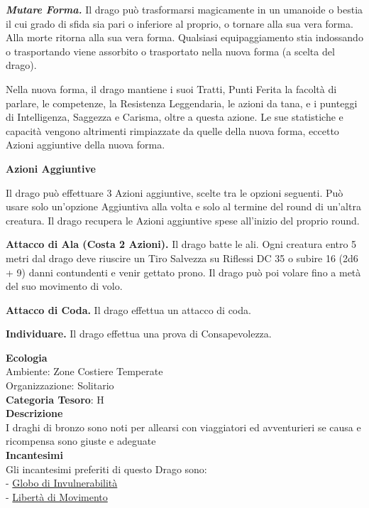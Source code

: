 \begin{multicols}{2}
{\emph{\textbf{Mutare Forma.}} Il drago può trasformarsi magicamente in un umanoide o bestia il cui grado di sfida sia pari o inferiore al proprio, o tornare alla sua vera forma. Alla morte ritorna alla sua vera forma. Qualsiasi equipaggiamento stia indossando o trasportando viene assorbito o trasportato nella nuova forma (a scelta del drago).

Nella nuova forma, il drago mantiene i suoi Tratti, Punti Ferita la facoltà di parlare, le competenze, la Resistenza Leggendaria, le azioni da tana, e i punteggi di Intelligenza, Saggezza e Carisma, oltre a questa azione. Le sue statistiche e capacità vengono altrimenti rimpiazzate da quelle della nuova forma, eccetto Azioni aggiuntive della nuova forma.

\textbf{Azioni Aggiuntive}

Il drago può effettuare 3 Azioni aggiuntive, scelte tra le opzioni seguenti. Può usare solo un'opzione Aggiuntiva alla volta e solo al termine del round di un'altra creatura. Il drago recupera le Azioni aggiuntive spese all'inizio del proprio round.

\textbf{Attacco di Ala (Costa 2 Azioni).} Il drago batte le ali. Ogni creatura entro 5 metri dal drago deve riuscire un Tiro Salvezza su Riflessi DC 35 o subire 16 (2d6 + 9) danni contundenti e venir gettato prono. Il drago può poi volare fino a metà del suo movimento di volo.

\textbf{Attacco di Coda.} Il drago effettua un attacco di coda.

\textbf{Individuare.} Il drago effettua una prova di Consapevolezza.

\textbf{Ecologia}\\
Ambiente: Zone Costiere Temperate\\
Organizzazione: Solitario\\
\textbf{Categoria Tesoro}: H\\
\textbf{Descrizione}\\
I draghi di bronzo sono noti per allearsi con viaggiatori ed avventurieri se causa e ricompensa sono giuste e adeguate\\
\textbf{Incantesimi}\\
Gli incantesimi preferiti di questo Drago sono:\\
- \hyperlink{Globo di Invulnerabilità}{Globo di Invulnerabilità}\\
- \hyperlink{Libertà di Movimento}{Libertà di Movimento}

}
\end{multicols}
